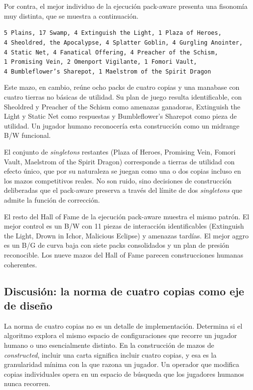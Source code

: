 Por contra, el mejor individuo de la ejecución pack-aware presenta una fisonomía muy distinta, que se muestra a continuación.

\begin{center}
\small
\texttt{5 Plains, 17 Swamp, 4 Extinguish the Light, 1 Plaza of Heroes,}\\
\texttt{4 Sheoldred, the Apocalypse, 4 Splatter Goblin, 4 Gurgling Anointer,}\\
\texttt{4 Static Net, 4 Fanatical Offering, 4 Preacher of the Schism,}\\
\texttt{1 Promising Vein, 2 Omenport Vigilante, 1 Fomori Vault,}\\
\texttt{4 Bumbleflower's Sharepot, 1 Maelstrom of the Spirit Dragon}
\end{center}

Este mazo, en cambio, reúne ocho packs de cuatro copias y una manabase con cuatro tierras no básicas de utilidad. Su plan de juego resulta identificable, con Sheoldred y Preacher of the Schism como amenazas ganadoras, Extinguish the Light y Static Net como respuestas y Bumbleflower's Sharepot como pieza de utilidad. Un jugador humano reconocería esta construcción como un midrange B/W funcional.

El conjunto de \emph{singletons} restantes (Plaza of Heroes, Promising Vein, Fomori Vault, Maelstrom of the Spirit Dragon) corresponde a tierras de utilidad con efecto único, que por su naturaleza se juegan como una o dos copias incluso en los mazos competitivos reales. No son ruido, sino decisiones de construcción deliberadas que el pack-aware preserva a través del límite de dos \emph{singletons} que admite la función de corrección.

El resto del Hall of Fame de la ejecución pack-aware muestra el mismo patrón. El mejor control es un B/W con 11 piezas de interacción identificables (Extinguish the Light, Drown in Ichor, Malicious Eclipse) y amenazas tardías. El mejor aggro es un B/G de curva baja con siete packs consolidados y un plan de presión reconocible. Los nueve mazos del Hall of Fame parecen construcciones humanas coherentes.

\subsection{Discusión: la norma de cuatro copias como eje de diseño}

La norma de cuatro copias no es un detalle de implementación. Determina si el algoritmo explora el mismo espacio de configuraciones que recorre un jugador humano o uno esencialmente distinto. En la construcción de mazos de \emph{constructed}, incluir una carta significa incluir cuatro copias, y esa es la granularidad mínima con la que razona un jugador. Un operador que modifica copias individuales opera en un espacio de búsqueda que los jugadores humanos nunca recorren.

